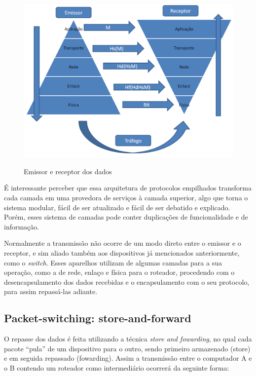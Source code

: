 \begin{figure}[h!]
\centering
\includegraphics[keepaspectratio, width=12cm, height=9cm]{imagens/08/08 - Emissor e receptor dos dados.png}
\caption{Emissor e receptor dos dados  \\}
\label{fig:Emissor e receptor dos dados }
\end{figure}



É interessante perceber que essa arquitetura de protocolos empilhados
transforma cada camada em uma provedora de serviços à camada superior,
algo que torna o sistema modular, fácil de ser atualizado e fácil de ser
debatido e explicado. Porém, esses sistema de camadas pode conter
duplicações de funcionalidade e de informação.

Normalmente a transmissão não ocorre de um modo direto entre o emissor e
o receptor, e sim aliado também aos dispositivos já mencionados
anteriormente, como o \emph{switch}. Esses aparelhos utilizam de algumas
camadas para a sua operação, como a de rede, enlaço e física para o
roteador, procedendo com o desencapsulamento dos dados recebidas e o
encapsulamento com o seu protocolo, para assim repassá-las adiante.

\hypertarget{packet-switching-store-and-forward}{%
\subsection{Packet-switching: store-and-forward}\label{packet-switching-store-and-forward}}

O repasse dos dados é feita utilizando a técnica \emph{store and
fowarding}, no qual cada pacote ``pula'' de um dispositivo para o outro,
sendo primeiro armazenado (store) e em seguida repassado (fowarding).
Assim a transmissão entre o computador A e o B contendo um roteador como
intermediário ocorrerá da seguinte forma:

